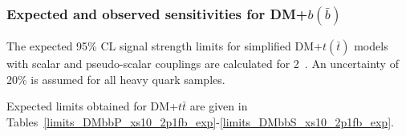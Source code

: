 
\subsubsection{Expected and observed sensitivities for DM+$b(\bar{b})$}

The expected 95\% CL signal strength limits for simplified DM+$t(\bar{t})$ models with scalar and
pseudo-scalar couplings are calculated for 2~\ifb. An uncertainty of 20\% is assumed for all 
heavy quark samples.




\clearpage
Expected limits obtained for DM+$t\bar{t}$ are given in Tables~\ref{limits_DMbbP_xs10_2p1fb_exp}-\ref{limits_DMbbS_xs10_2p1fb_exp}. 



%
%



